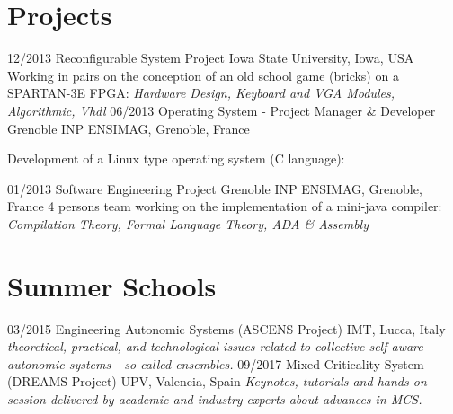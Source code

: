 \documentclass[]{friggeri-cv}
\begin{document}
\section{Projects}
    \vspace*{-3mm}
\begin{entrylist}
    \entry
    {12/2013}
    {Reconfigurable System Project}
    {Iowa State University, Iowa, USA}
    {Working in pairs on the conception of an old school game (bricks) on a SPARTAN-3E FPGA:
            \emph{Hardware Design, Keyboard and VGA Modules, Algorithmic, Vhdl}
    }
    \entry
    {06/2013}
    {Operating System - Project Manager \& Developer}
    {Grenoble INP ENSIMAG, Grenoble, France}
    {Development of a Linux type operating system (C language):
        \begin{itemize}
        \end{itemize}
    }
    \entry
    {01/2013}
    {Software Engineering Project}
    {Grenoble INP ENSIMAG, Grenoble, France}
    {4 persons team working on the implementation of a mini-java compiler:
            \emph{Compilation Theory, Formal Language Theory, ADA \& Assembly}
    }
  
\end{entrylist}
    \vspace*{-3mm}

\section{Summer Schools}
\begin{entrylist}
  \entry
    {03/2015}
    {Engineering Autonomic Systems (ASCENS Project)}
    {IMT, Lucca, Italy}
    {\emph{theoretical, practical, and technological issues related to collective self-aware autonomic systems - so-called ensembles.}}
  \entry
    {09/2017}
    {Mixed Criticality System (DREAMS Project)}
    {UPV, Valencia, Spain}
    {\emph{Keynotes, tutorials and hands-on session delivered by academic and industry experts about advances in MCS.}}
\end{entrylist}

\makeprofile
\end{document}

